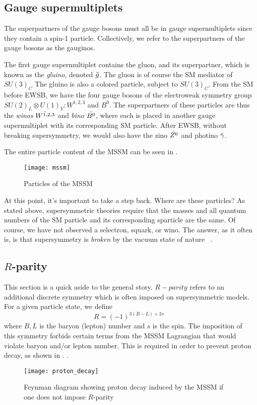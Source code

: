 \subsection{Gauge supermultiplets}

The superpartners of the gauge bosons must all be in gauge supermultiplets since they contain a spin-1 particle.
Collectively, we refer to the superpartners of the gauge bosons as the gauginos.

The first gauge supermultiplet contains the gluon, and its superpartner, which is known as the \textit{gluino}, denoted $\tilde{g}$.
The gluon is of course the SM mediator of $SU(3)_C$
The gluino is also a colored particle, subject to $SU(3)_C$.
From the SM before EWSB, we have the four gauge bosons of the electroweak symmetry group $SU(2)_L \otimes U(1)_Y : W^{1,2,3}$ and $B^0$.
The superpartners of these particles are thus the \textit{winos} $\tilde{W^{1,2,3}}$ and \textit{bino} $\tilde{B^0}$, where each is placed in another gauge supermultiplet with its corresponding SM particle.
After EWSB, without breaking supersymmetry, we would also have the zino $\tilde{Z^0}$ and photino $\tilde{\gamma}$.

The entire particle content of the MSSM can be seen in .
\begin{figure}
\caption{Particles of the MSSM} \label{fig:mssm}
\texttt{[image: mssm]}
\end{figure}

At this point, it's important to take a step back.
Where are these particles?
As stated above, supersymmetric theories require that the masses and all quantum numbers of the SM particle and its corresponding sparticle are the same.
Of course, we have not observed a selectron, squark, or wino.
The answer, as it often is, is that supersymmetry is \textit{broken} by the vacuum state of nature ~\cite{susyPrimer}.

\subsection{$R$-parity}\label{sec:r_parity}

This section is a quick aside to the general story.
$R-parity$ refers to an additional discrete symmetry which is often imposed on supersymmetric models.
For a given particle state, we define
\begin{equation}
R = (-1)^{3(B-L) + 2s}
\end{equation}
where $B,L$ is the baryon (lepton) number and $s$ is the spin.
The imposition of this symmetry forbids certain terms from the MSSM Lagrangian that would violate baryon and/or lepton number.
This is required in order to prevent proton decay, as shown in \footnotemark.
.
\begin{figure}
\caption{Feynman diagram showing proton decay induced by the MSSM if one does not impose $R$-parity}\label{fig:proton_decay}
\texttt{[image: proton\_decay]}
\end{figure}

